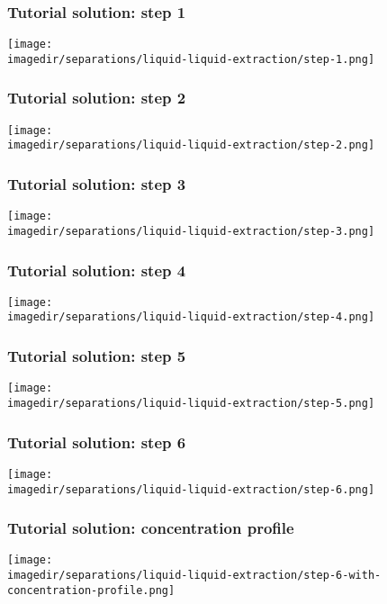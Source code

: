 \begin{frame}\frametitle{Tutorial solution: step 1}
	\begin{center}
		\texttt{[image: \\imagedir/separations/liquid-liquid-extraction/step-1.png]}
	\end{center}
\end{frame}

\begin{frame}\frametitle{Tutorial solution: step 2}
	\begin{center}
		\texttt{[image: \\imagedir/separations/liquid-liquid-extraction/step-2.png]}
	\end{center}
\end{frame}

\begin{frame}\frametitle{Tutorial solution: step 3}
	\begin{center}
		\texttt{[image: \\imagedir/separations/liquid-liquid-extraction/step-3.png]}
	\end{center}
\end{frame}

\begin{frame}\frametitle{Tutorial solution: step 4}
	\begin{center}
		\texttt{[image: \\imagedir/separations/liquid-liquid-extraction/step-4.png]}
	\end{center}
\end{frame}

\begin{frame}\frametitle{Tutorial solution: step 5}
	\begin{center}
		\texttt{[image: \\imagedir/separations/liquid-liquid-extraction/step-5.png]}
	\end{center}
\end{frame}

\begin{frame}\frametitle{Tutorial solution: step 6}
	\begin{center}
		\texttt{[image: \\imagedir/separations/liquid-liquid-extraction/step-6.png]}
	\end{center}
\end{frame}

\begin{frame}\frametitle{Tutorial solution: concentration profile}
	\begin{center}
		\texttt{[image: \\imagedir/separations/liquid-liquid-extraction/step-6-with-concentration-profile.png]}
	\end{center}
\end{frame}

